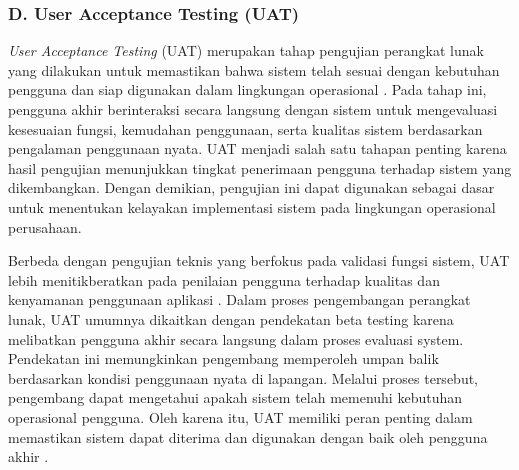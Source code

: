 \subsubsection*{D. User Acceptance Testing (UAT)} \label{II.UAT}
\textit{User Acceptance Testing} (UAT) merupakan tahap pengujian perangkat lunak yang dilakukan untuk memastikan bahwa sistem telah sesuai dengan kebutuhan pengguna dan siap digunakan dalam lingkungan operasional \cite{prasnowo2024waterfall}. Pada tahap ini, pengguna akhir berinteraksi secara langsung dengan sistem untuk mengevaluasi kesesuaian fungsi, kemudahan penggunaan, serta kualitas sistem berdasarkan pengalaman penggunaan nyata. UAT menjadi salah satu tahapan penting karena hasil pengujian menunjukkan tingkat penerimaan pengguna terhadap sistem yang dikembangkan. Dengan demikian, pengujian ini dapat digunakan sebagai dasar untuk menentukan kelayakan implementasi sistem pada lingkungan operasional perusahaan. \par
Berbeda dengan pengujian teknis yang berfokus pada validasi fungsi sistem, UAT lebih menitikberatkan pada penilaian pengguna terhadap kualitas dan kenyamanan penggunaan aplikasi \cite{prasnowo2024waterfall}. Dalam proses pengembangan perangkat lunak, UAT umumnya dikaitkan dengan pendekatan beta testing karena melibatkan pengguna akhir secara langsung dalam proses evaluasi system. Pendekatan ini memungkinkan pengembang memperoleh umpan balik berdasarkan kondisi penggunaan nyata di lapangan. Melalui proses tersebut, pengembang dapat mengetahui apakah sistem telah memenuhi kebutuhan operasional pengguna. Oleh karena itu, UAT memiliki peran penting dalam memastikan sistem dapat diterima dan digunakan dengan baik oleh pengguna akhir \cite{prasnowo2024waterfall}. \par

